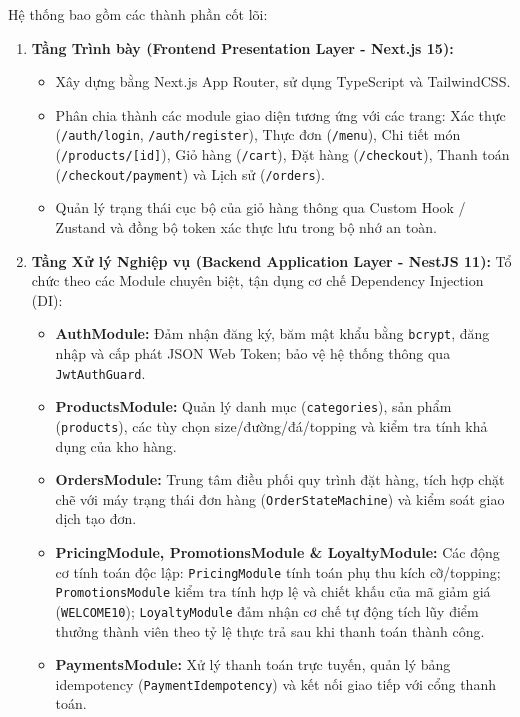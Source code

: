 \documentclass[12pt,a4paper,oneside]{report}
\begin{document}
Hệ thống bao gồm các thành phần cốt lõi:
\begin{enumerate}
    \item \textbf{Tầng Trình bày (Frontend Presentation Layer - Next.js 15):}
    \begin{itemize}
        \item Xây dựng bằng Next.js App Router, sử dụng TypeScript và TailwindCSS.
        \item Phân chia thành các module giao diện tương ứng với các trang: Xác thực (\texttt{/auth/login}, \texttt{/auth/register}), Thực đơn (\texttt{/menu}), Chi tiết món (\texttt{/products/}\allowbreak\texttt{[id]}), Giỏ hàng (\texttt{/cart}), Đặt hàng (\texttt{/checkout}), Thanh toán (\texttt{/checkout/payment}) và Lịch sử (\texttt{/orders}).
        \item Quản lý trạng thái cục bộ của giỏ hàng thông qua Custom Hook / Zustand và đồng bộ token xác thực lưu trong bộ nhớ an toàn.
    \end{itemize}
    \item \textbf{Tầng Xử lý Nghiệp vụ (Backend Application Layer - NestJS 11):}
    Tổ chức theo các Module chuyên biệt, tận dụng cơ chế Dependency Injection (DI):
    \begin{itemize}
        \item \textbf{AuthModule:} Đảm nhận đăng ký, băm mật khẩu bằng \texttt{bcrypt}, đăng nhập và cấp phát JSON Web Token; bảo vệ hệ thống thông qua \texttt{JwtAuthGuard}.
        \item \textbf{ProductsModule:} Quản lý danh mục (\texttt{categories}), sản phẩm (\texttt{products}), các tùy chọn size/đường/đá/topping và kiểm tra tính khả dụng của kho hàng.
        \item \textbf{OrdersModule:} Trung tâm điều phối quy trình đặt hàng, tích hợp chặt chẽ với máy trạng thái đơn hàng (\texttt{Order}\allowbreak\texttt{StateMachine}) và kiểm soát giao dịch tạo đơn.
        \item \textbf{PricingModule, PromotionsModule \& LoyaltyModule:} Các động cơ tính toán độc lập: \texttt{PricingModule} tính toán phụ thu kích cỡ/topping; \texttt{PromotionsModule} kiểm tra tính hợp lệ và chiết khấu của mã giảm giá (\texttt{WELCOME10}); \texttt{LoyaltyModule} đảm nhận cơ chế tự động tích lũy điểm thưởng thành viên theo tỷ lệ thực trả sau khi thanh toán thành công.
        \item \textbf{PaymentsModule:} Xử lý thanh toán trực tuyến, quản lý bảng idempotency (\texttt{PaymentIdempotency}) và kết nối giao tiếp với cổng thanh toán.

\end{itemize}
\end{enumerate}
\end{document}
